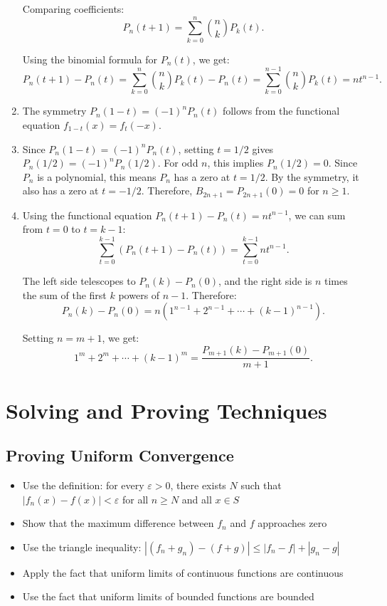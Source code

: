 \begin{enumerate}[label=(\alph*)]
Comparing coefficients:
\[P_n(t+1) = \sum_{k=0}^n \binom{n}{k} P_k(t).\]

Using the binomial formula for \( P_n(t) \), we get:
\[P_n(t+1) - P_n(t) = \sum_{k=0}^n \binom{n}{k} P_k(t) - P_n(t) = \sum_{k=0}^{n-1} \binom{n}{k} P_k(t) = nt^{n-1}.\]

\item The symmetry \( P_n(1-t) = (-1)^n P_n(t) \) follows from the functional equation \( f_{1-t}(x) = f_t(-x) \).

\item Since \( P_n(1-t) = (-1)^n P_n(t) \), setting \( t = 1/2 \) gives \( P_n(1/2) = (-1)^n P_n(1/2) \). For odd \( n \), this implies \( P_n(1/2) = 0 \). Since \( P_n \) is a polynomial, this means \( P_n \) has a zero at \( t = 1/2 \). By the symmetry, it also has a zero at \( t = -1/2 \). Therefore, \( B_{2n+1} = P_{2n+1}(0) = 0 \) for \( n \geq 1 \).

\item Using the functional equation \( P_n(t+1) - P_n(t) = nt^{n-1} \), we can sum from \( t = 0 \) to \( t = k-1 \):
\[\sum_{t=0}^{k-1} (P_n(t+1) - P_n(t)) = \sum_{t=0}^{k-1} nt^{n-1}.\]

The left side telescopes to \( P_n(k) - P_n(0) \), and the right side is \( n \) times the sum of the first \( k \) powers of \( n-1 \). Therefore:
\[P_n(k) - P_n(0) = n(1^{n-1} + 2^{n-1} + \cdots + (k-1)^{n-1}).\]

Setting \( n = m+1 \), we get:
\[1^m + 2^m + \cdots + (k-1)^m = \frac{P_{m+1}(k) - P_{m+1}(0)}{m+1}.\]
\end{enumerate}

\section{Solving and Proving Techniques}

\subsection*{Proving Uniform Convergence}
\begin{itemize}
\item Use the definition: for every $\varepsilon > 0$, there exists $N$ such that $|f_n(x) - f(x)| < \varepsilon$ for all $n \geq N$ and all $x \in S$
\item Show that the maximum difference between $f_n$ and $f$ approaches zero
\item Use the triangle inequality: $|(f_n + g_n) - (f + g)| \leq |f_n - f| + |g_n - g|$
\item Apply the fact that uniform limits of continuous functions are continuous
\item Use the fact that uniform limits of bounded functions are bounded
\end{itemize}

